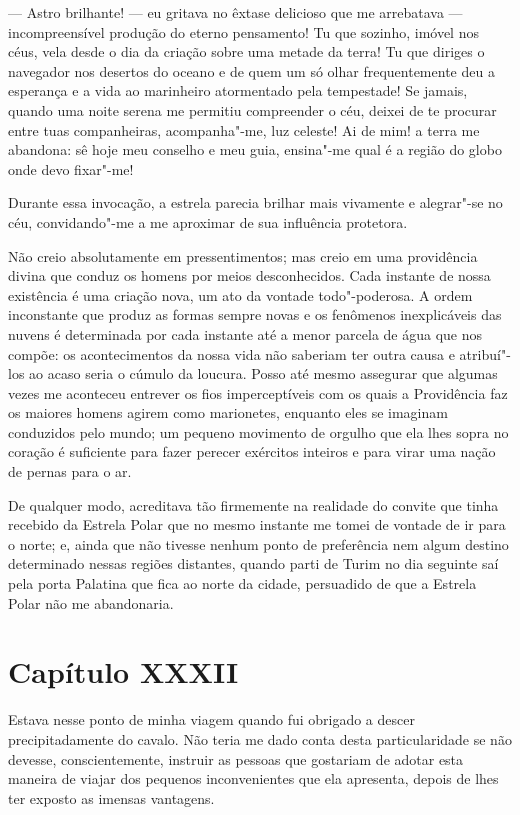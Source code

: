  --- Astro brilhante! --- eu gritava no êxtase delicioso que me arrebatava --- 
incompreensível produção do eterno pensamento! Tu que sozinho, imóvel
nos céus, vela desde o dia da criação sobre uma metade da terra! Tu que
diriges o navegador nos desertos do oceano e de quem um só olhar
frequentemente deu a esperança e a vida ao marinheiro atormentado pela
tempestade! Se jamais, quando uma noite serena me permitiu compreender
o céu, deixei de te procurar entre tuas companheiras, acompanha"-me, luz
celeste! Ai de mim! a terra me abandona: sê hoje meu conselho e meu
guia, ensina"-me qual é a região do globo onde devo fixar"-me!

 Durante essa invocação, a estrela parecia brilhar mais vivamente e
alegrar"-se no céu, convidando"-me a me aproximar de sua influência
protetora.

 Não creio absolutamente em pressentimentos; mas creio em uma
providência divina que conduz os homens por meios desconhecidos. Cada
instante de nossa existência é uma criação nova, um ato da vontade
todo"-poderosa. A ordem inconstante que produz as formas sempre novas e
os fenômenos inexplicáveis das nuvens é determinada por cada instante
até a menor parcela de água que nos compõe: os acontecimentos da nossa
vida não saberiam ter outra causa e atribuí"-los ao acaso seria o cúmulo
da loucura. Posso até mesmo assegurar que algumas vezes me aconteceu
entrever os fios imperceptíveis com os quais a Providência faz os
maiores homens agirem como marionetes, enquanto eles se imaginam
conduzidos pelo mundo; um pequeno movimento de orgulho que ela lhes
sopra no coração é suficiente para fazer perecer exércitos inteiros e
para virar uma nação de pernas para o ar. 

 De qualquer modo, acreditava tão firmemente na realidade do convite que
tinha recebido da Estrela Polar que no mesmo instante me tomei de
vontade de ir para o norte; e, ainda que não tivesse nenhum ponto de
preferência nem algum destino determinado nessas regiões distantes,
quando parti de Turim no dia seguinte saí pela porta Palatina que fica
ao norte da cidade, persuadido de que a Estrela Polar não me
abandonaria. 

\section*{Capítulo XXXII}

 Estava nesse ponto de minha viagem quando fui obrigado a descer
precipitadamente do cavalo. Não teria me dado conta desta
particularidade se não devesse, conscientemente, instruir as pessoas
que gostariam de adotar esta maneira de viajar dos pequenos
inconvenientes que ela apresenta, depois de lhes ter exposto as
imensas vantagens.

